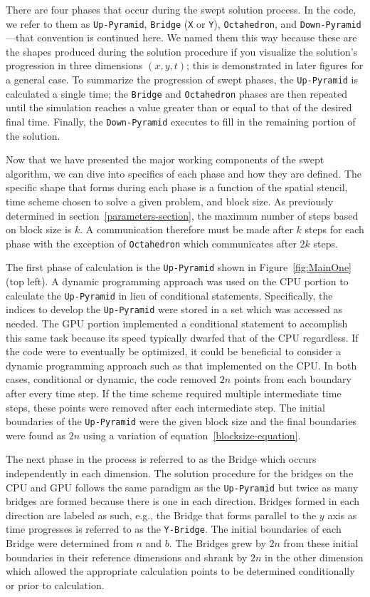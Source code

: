 \documentclass[mca,article,submit,moreauthors,pdftex]{Definitions/mdpi}
\def\Up{\texttt{Up-Pyramid}}
\def\Down{\texttt{Down-Pyramid}}
\def\Oct{\texttt{Octahedron}}
\def\Yb{\texttt{Y-Bridge}}
\begin{document}
There are four phases that occur during the swept solution process. In the code, we refer to them as \Up{}, \texttt{Bridge} (\texttt{X} or \texttt{Y}), \Oct{}, and \Down{}---that convention is continued here. We named them this way because these are the shapes produced during the solution procedure if you visualize the solution's progression in three dimensions $(x,y,t)$; this is demonstrated in later figures for a general case. To summarize the progression of swept phases, the \Up{} is calculated a single time; the \texttt{Bridge} and \Oct{} phases are then repeated until the simulation reaches a value greater than or equal to that of the desired final time. Finally, the \Down{} executes to fill in the remaining portion of the solution. 

Now that we have presented the major working components of the swept algorithm, we can dive into specifics of each phase and how they are defined. The specific shape that forms during each phase is a function of the spatial stencil, time scheme chosen to solve a given problem, and block size. As previously determined in section~\ref{parameters-section}, the maximum number of steps based on block size is $k$. A communication therefore must be made after $k$ steps for each phase with the exception of \Oct{} which communicates after $2k$ steps.
 
The first phase of calculation is the \Up{} shown in Figure~\ref{fig:MainOne} (top left). A dynamic programming approach was used on the CPU portion to calculate the \Up{} in lieu of conditional statements. Specifically, the indices to develop the \Up{} were stored in a set which was accessed as needed. The GPU portion implemented a conditional statement to accomplish this same task because its speed typically dwarfed that of the CPU regardless. If the code were to eventually be optimized, it could be beneficial to consider a dynamic programming approach such as that implemented on the CPU. In both cases, conditional or dynamic, the code removed $2n$ points from each boundary after every time step. If the time scheme required multiple intermediate time steps, these points were removed after each intermediate step. The initial boundaries of the \Up{} were the given block size and the final boundaries were found as $2n$ using a variation of equation~\ref{blocksize-equation}.

The next phase in the process is referred to as the Bridge which occurs independently in each dimension. The solution procedure for the bridges on the CPU and GPU follows the same paradigm as the \Up{} but twice as many bridges are formed because there is one in each direction. Bridges formed in each direction are labeled as such, e.g., the Bridge that forms parallel to the $y$ axis as time progresses is referred to as the \Yb{}. The initial boundaries of each Bridge were determined from $n$ and $b$. The Bridges grew by $2n$ from these initial boundaries in their reference dimensions and shrank by $2n$ in the other dimension which allowed the appropriate calculation points to be determined conditionally or prior to calculation.
\end{document}
